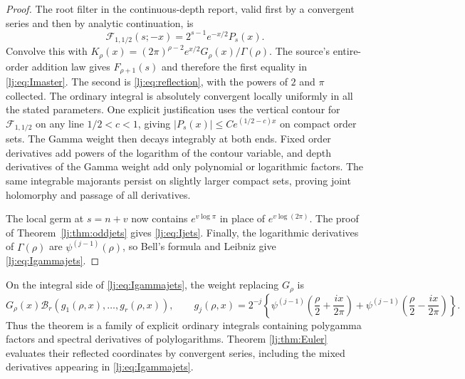 \documentclass[11pt,a4paper]{article}
\numberwithin{equation}{section}
\theoremstyle{definition}
\theoremstyle{remark}
\begin{document}
\begin{proof}
The root filter in the continuous-depth report, valid first by a
convergent series and then by analytic continuation, is
\[
 \mathcal F_{1,1/2}(s;-x)=2^{s-1}e^{-x/2}P_s(x).
\]
Convolve this with
$K_\rho(x)=(2\pi)^{\rho-2}e^{x/2}G_\rho(x)/\Gamma(\rho)$.
The source's entire-order addition law gives $F_{\rho+1}(s)$ and
therefore the first equality in \eqref{lj:eq:Imaster}. The second is
\eqref{lj:eq:reflection}, with the powers of $2$ and $\pi$ collected.
The ordinary integral is absolutely convergent locally uniformly in
all the stated parameters. One explicit justification uses the vertical
contour for $\mathcal F_{1,1/2}$ on any line $1/2<c<1$, giving
$|P_s(x)|\leq C e^{(1/2-c)x}$ on compact order sets. The Gamma weight
then decays integrably at both ends. Fixed order derivatives add powers
of the logarithm of the contour variable, and depth derivatives of the
Gamma weight add only polynomial or logarithmic factors. The same
integrable majorants persist on slightly larger compact sets, proving
joint holomorphy and passage of all derivatives.

The local germ at $s=n+v$ now contains $e^{v\log\pi}$ in place of
$e^{v\log(2\pi)}$. The proof of Theorem~\ref{lj:thm:oddjets} gives
\eqref{lj:eq:Ijets}. Finally, the logarithmic derivatives of
$\Gamma(\rho)$ are $\psi^{(j-1)}(\rho)$, so Bell's formula and Leibniz
give \eqref{lj:eq:Igammajets}.
\end{proof}

On the integral side of \eqref{lj:eq:Igammajets}, the weight replacing
$G_\rho$ is
\[
 G_\rho(x)\mathcal B_r(g_1(\rho,x),\ldots,g_r(\rho,x)),\qquad
 g_j(\rho,x)=2^{-j}\left\{
 \psi^{(j-1)}\left(\frac\rho2+\frac{ix}{2\pi}\right)
 +\psi^{(j-1)}\left(\frac\rho2-\frac{ix}{2\pi}\right)\right\}.
\]
Thus the theorem is a family of explicit ordinary integrals containing
polygamma factors and spectral derivatives of polylogarithms. Theorem
\ref{lj:thm:Euler} evaluates their reflected coordinates by convergent
series, including the mixed derivatives appearing in
\eqref{lj:eq:Igammajets}.
\end{document}
